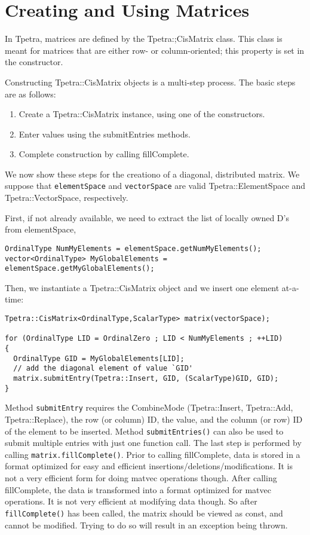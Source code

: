 \section{Creating and Using Matrices}
\label{sec:tpetra_matrices}

In Tpetra, matrices are defined by the Tpetra:;CisMatrix class. This class is
meant for matrices that are either row- or column-oriented; this property is
set in the constructor.

Constructing Tpetra::CisMatrix objects is a multi-step process. The basic
steps are as follows:
\begin{enumerate}
\itemsep=1pt
\item Create a Tpetra::CisMatrix instance, using one of the constructors.
\item Enter values using the submitEntries methods.
\item Complete construction by calling fillComplete.
\end{enumerate}
We now show these steps for the creationo of a diagonal, 
distributed matrix. We suppose that {\tt elementSpace} and
{\tt vectorSpace} are valid Tpetra::ElementSpace and Tpetra::VectorSpace,
  respectively.

First, if not already available, we need to extract the list of locally owned
D's from elementSpace,
\begin{verbatim}
OrdinalType NumMyElements = elementSpace.getNumMyElements();
vector<OrdinalType> MyGlobalElements = elementSpace.getMyGlobalElements();
\end{verbatim}
Then, we instantiate a Tpetra::CisMatrix object and we insert one element
at-a-time:
\begin{verbatim}
Tpetra::CisMatrix<OrdinalType,ScalarType> matrix(vectorSpace);

for (OrdinalType LID = OrdinalZero ; LID < NumMyElements ; ++LID)
{
  OrdinalType GID = MyGlobalElements[LID];
  // add the diagonal element of value `GID'
  matrix.submitEntry(Tpetra::Insert, GID, (ScalarType)GID, GID);
}
\end{verbatim}
Method {\tt submitEntry} requires the CombineMode 
(Tpetra::Insert, Tpetra::Add, Tpetra::Replace), the row (or column) ID, the
value, and the column (or row) ID of the
element to be inserted.  Method \verb!submitEntries()! can also be used to
submit multiple entries with just one function call. The last step is
performed by calling \verb!matrix.fillComplete()!. Prior
to calling fillComplete, data is stored in a format optimized for
easy and efficient insertions/deletions/modifications. It is not a
very efficient form for doing matvec operations though. After calling
fillComplete, the data is transformed into a format optimized for
matvec operations. It is not very efficient at modifying data though.
So after \verb!fillComplete()! has been called, the matrix should be viewed as
const, and cannot be modified. Trying to do so will result in an exception being thrown.


